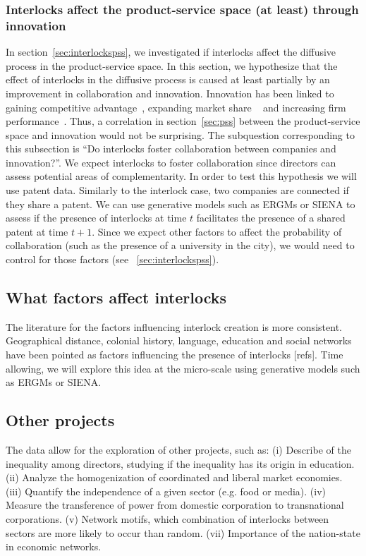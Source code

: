\subsubsection{Interlocks affect the product-service space (at least) through innovation}
In section~\ref{sec:interlockspss}, we investigated if interlocks affect the diffusive process in the product-service space.
In this section, we hypothesize that the effect of interlocks in the diffusive process is caused at least partially by an improvement in collaboration and innovation.
Innovation has been linked to gaining competitive advantage~\citep{Hitt1996}, expanding market share ~\citep{Franko1989} and increasing firm performance~\citep{Morbey1988}.
Thus, a correlation in section~\ref{sec:pss} between the product-service space and innovation would not be surprising. 
The subquestion corresponding to this subsection is ``Do interlocks foster collaboration between companies and innovation?''.
We expect interlocks to foster collaboration since directors can assess potential areas of complementarity.
In order to test this hypothesis we will use patent data.
Similarly to the interlock case, two companies are connected if they share a patent.
We can use generative models such as ERGMs or SIENA to assess if the presence of interlocks at time $t$ facilitates the presence of a shared patent at time $t+1$. 
Since we expect other factors to affect the probability of collaboration (such as the presence of a university in the city),
we would need to control for those factors (see ~\ref{sec:interlockspss}).


\subsection{What factors affect interlocks}
\label{sec:factors}
The literature for the factors influencing interlock creation is more consistent.
Geographical distance, colonial history, language, education and social networks have been pointed as factors influencing the presence of interlocks [refs].
Time allowing, we will explore this idea at the micro-scale using generative models such as ERGMs or SIENA.


\subsection{Other projects}
\label{sec:other}
The data allow for the exploration of other projects, such as:
(i) Describe of the inequality among directors, studying if the inequality has its origin in education.
(ii) Analyze the homogenization of coordinated and liberal market economies.
(iii) Quantify the independence of a given sector (e.g. food or media).
(iv) Measure the transference of power from domestic corporation to transnational corporations.
(v) Network motifs, which combination of interlocks between sectors are more likely to occur than random.
(vii) Importance of the nation-state in economic networks.